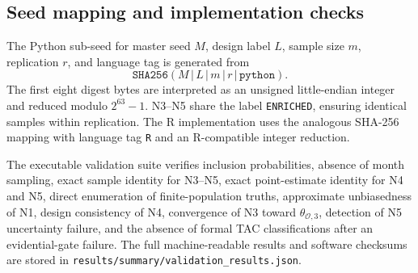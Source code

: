 \subsection{Seed mapping and implementation checks}

The Python sub-seed for master seed \(M\), design label \(L\), sample size
\(m\), replication \(r\), and language tag is generated from
\[
  \texttt{SHA256}(M\,|\,L\,|\,m\,|\,r\,|\,\texttt{python}).
\]
The first eight digest bytes are interpreted as an unsigned little-endian
integer and reduced modulo \(2^{63}-1\). N3--N5 share the label
\texttt{ENRICHED}, ensuring identical samples within replication. The R
implementation uses the analogous SHA-256 mapping with language tag
\texttt{R} and an R-compatible integer reduction.

The executable validation suite verifies inclusion probabilities, absence of
month sampling, exact sample identity for N3--N5, exact point-estimate identity
for N4 and N5, direct enumeration of finite-population truths, approximate
unbiasedness of N1, design consistency of N4, convergence of N3 toward
\(\theta_{\mathcal O,3}\), detection of N5 uncertainty failure, and the absence
of formal TAC classifications after an evidential-gate failure. The full
machine-readable results and software checksums are stored in
\texttt{results/summary/validation\_results.json}.

